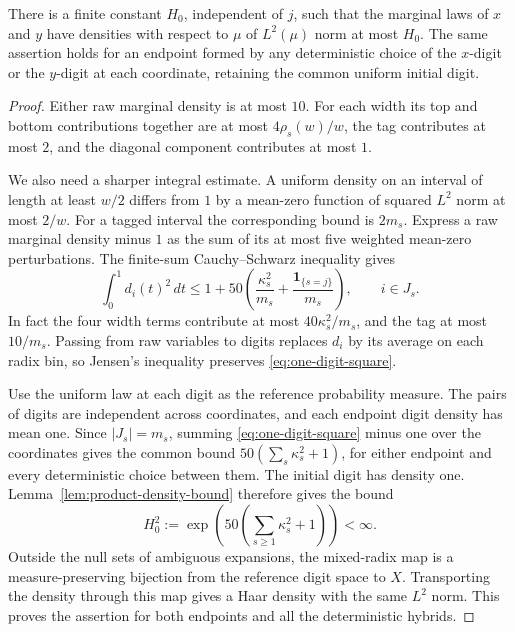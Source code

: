 \begin{lemma}\label{lem:digit-marginals}
There is a finite constant $H_0$, independent of $j$, such that the
marginal laws of $x$ and $y$ have densities with respect to $\mu$ of
$L^2(\mu)$ norm at most $H_0$. The same assertion holds for an endpoint
formed by any deterministic choice of the $x$-digit or the $y$-digit at
each coordinate, retaining the common uniform initial digit.
\end{lemma}

\begin{proof}
Either raw marginal density is at most $10$. For each width its top and
bottom contributions together are at most $4\rho_s(w)/w$, the tag
contributes at most $2$, and the diagonal component contributes at most
$1$.

We also need a sharper integral estimate. A uniform density on an
interval of length at least $w/2$ differs from $1$ by a mean-zero
function of squared $L^2$ norm at most $2/w$. For a tagged interval the
corresponding bound is $2m_s$. Express a raw marginal density minus $1$
as the sum of its at most five weighted mean-zero perturbations. The
finite-sum Cauchy--Schwarz inequality gives
\begin{equation}\label{eq:one-digit-square}
 \int_0^1 d_i(t)^2\,dt
 \le 1+50\left(\frac{\kappa_s^2}{m_s}
          +\frac{\mathbf 1_{\{s=j\}}}{m_s}\right),
 \qquad i\in J_s.
\end{equation}
In fact the four width terms contribute at most
$40\kappa_s^2/m_s$, and the tag at most $10/m_s$. Passing from raw
variables to digits replaces $d_i$ by its average on each radix bin, so
Jensen's inequality preserves \eqref{eq:one-digit-square}.

Use the uniform law at each digit as the reference probability measure.
The pairs of digits are independent across coordinates, and each
endpoint digit density has mean one. Since $|J_s|=m_s$, summing
\eqref{eq:one-digit-square} minus one over the coordinates gives the
common bound $50(\sum_s\kappa_s^2+1)$, for either endpoint and every
deterministic choice between them. The initial digit has density one.
Lemma~\ref{lem:product-density-bound} therefore gives the bound
\[
 H_0^2:=\exp\left(50\left(\sum_{s\ge1}\kappa_s^2+1\right)\right)<\infty.
\]
Outside the null sets of ambiguous expansions, the mixed-radix map is
a measure-preserving bijection from the reference digit space to $X$.
Transporting the density through this map gives a Haar density with
the same $L^2$ norm. This proves the assertion for both endpoints and
all the deterministic hybrids.
\end{proof}

